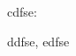 \begin{circus}
   \circchannel cdfse: \nat \cross \nat \cross \nat %
\end{circus}

\begin{circus}
   \circchannel ddfse, edfse
\end{circus}




%

